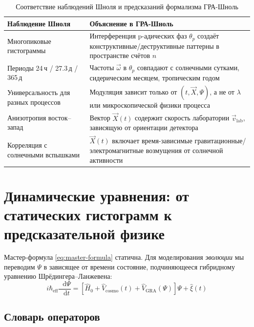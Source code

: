 \documentclass[12pt,a4paper]{article}
\theoremstyle{plain}
\theoremstyle{definition}
\theoremstyle{remark}
\newcommand{\GRA}{\text{GRA}}
\newcommand{\eff}{\text{eff}}
\newcommand{\cosmo}{\text{cosmo}}
\newcommand{\vX}{\vec{X}}
\newcommand{\vomega}{\vec{\omega}}
\newcommand{\diff}{\mathop{}\!\mathrm{d}}
\begin{document}
\begin{table}[H]
\centering
\caption{Соответствие наблюдений Шноля и предсказаний формализма ГРА-Шноль}
\label{tab:shnoll-explanation}
\renewcommand{\arraystretch}{1.4}
\begin{tabular}{@{}lp{10cm}@{}}
\toprule
\textbf{Наблюдение Шноля} & \textbf{Объяснение в ГРА-Шноль} \\
\midrule
Многопиковые гистограммы & Интерференция p-адических фаз $\theta_p$ создаёт конструктивные/деструктивные паттерны в пространстве счётов $n$ \\
\addlinespace
Периоды 24\,ч / 27.3\,д / 365\,д & Частоты $\vomega$ в $\theta_p$ совпадают с солнечными сутками, сидерическим месяцем, тропическим годом \\
\addlinespace
Универсальность для разных процессов & Модуляция зависит только от $(t, \vX, \Psi)$, а не от $\lambda$ или микроскопической физики процесса \\
\addlinespace
Анизотропия восток--запад & Вектор $\vX(t)$ содержит скорость лаборатории $\vec{v}_{\text{lab}}$, зависящую от ориентации детектора \\
\addlinespace
Корреляция с солнечными вспышками & $\vX(t)$ включает время-зависимые гравитационные/электромагнитные возмущения от солнечной активности \\
\bottomrule
\end{tabular}
\end{table}

\section{Динамические уравнения: от статических гистограмм к предсказательной физике}
\label{sec:dynamics}

Мастер-формула \eqref{eq:master-formula} статична. Для моделирования \emph{эволюции} мы переводим $\Psi$ в зависящее от времени состояние, подчиняющееся гибридному уравнению Шрёдингера--Ланжевена:
\begin{equation}
\boxed{
i\hbar_{\eff} \frac{\diff \Psi}{\diff t} = 
\left[ \hat{H}_0 + \hat{V}_{\cosmo}(t) + \hat{V}_{\GRA}(\Psi) \right] \Psi + \hat{\xi}(t)
}
\label{eq:hybrid-evolution}
\end{equation}

\subsection{Словарь операторов}
\end{document}
